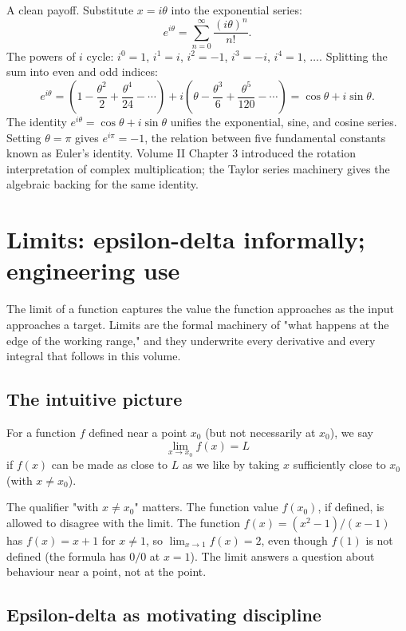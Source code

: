A clean payoff. Substitute $x = i\theta$ into the exponential series:
\[
e^{i\theta} = \sum_{n=0}^{\infty} \frac{(i\theta)^{n}}{n!}.
\]
The powers of $i$ cycle: $i^{0} = 1$, $i^{1} = i$, $i^{2} = -1$,
$i^{3} = -i$, $i^{4} = 1$, $\ldots$. Splitting the sum into even and
odd indices:
\[
e^{i\theta} = \left(1 - \frac{\theta^{2}}{2} + \frac{\theta^{4}}{24}
- \cdots\right) + i \left(\theta - \frac{\theta^{3}}{6}
+ \frac{\theta^{5}}{120} - \cdots\right) = \cos\theta + i \sin\theta.
\]
The identity $e^{i\theta} = \cos\theta + i \sin\theta$ unifies the
exponential, sine, and cosine series. Setting $\theta = \pi$ gives
$e^{i\pi} = -1$, the relation between five fundamental constants
known as Euler's identity. Volume II Chapter 3 introduced the rotation
interpretation of complex multiplication; the Taylor series machinery
gives the algebraic backing for the same identity.

\section{Limits: epsilon-delta informally; engineering use}

The limit of a function captures the value the function approaches as
the input approaches a target. Limits are the formal machinery of
"what happens at the edge of the working range," and they underwrite
every derivative and every integral that follows in this volume.

\subsection{The intuitive picture}

For a function $f$ defined near a point $x_{0}$ (but not necessarily
at $x_{0}$), we say
\[
\lim_{x \to x_{0}} f(x) = L
\]
if $f(x)$ can be made as close to $L$ as we like by taking $x$
sufficiently close to $x_{0}$ (with $x \neq x_{0}$).

The qualifier "with $x \neq x_{0}$" matters. The function value
$f(x_{0})$, if defined, is allowed to disagree with the limit. The
function $f(x) = (x^{2} - 1)/(x - 1)$ has $f(x) = x + 1$ for $x \neq
1$, so $\lim_{x \to 1} f(x) = 2$, even though $f(1)$ is not defined
(the formula has $0/0$ at $x = 1$). The limit answers a question about
behaviour near a point, not at the point.

\subsection{Epsilon-delta as motivating discipline}

